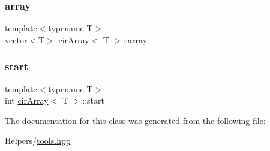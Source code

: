 \subsubsection{\texorpdfstring{array}{array}}
{\footnotesize\ttfamily template$<$typename T$>$ \\
vector$<$T$>$ \mbox{\hyperlink{classcirArray}{cir\+Array}}$<$ T $>$\+::array\hspace{0.3cm}{\ttfamily [private]}}

\mbox{\label{classcirArray_a7233e3d591e61dee5a16656f3db8f386}} 
\subsubsection{\texorpdfstring{start}{start}}
{\footnotesize\ttfamily template$<$typename T$>$ \\
int \mbox{\hyperlink{classcirArray}{cir\+Array}}$<$ T $>$\+::start\hspace{0.3cm}{\ttfamily [private]}}



The documentation for this class was generated from the following file\+:\begin{DoxyCompactItemize}
\item 
Helpers/\mbox{\hyperlink{tools_8hpp}{tools.\+hpp}}\end{DoxyCompactItemize}
